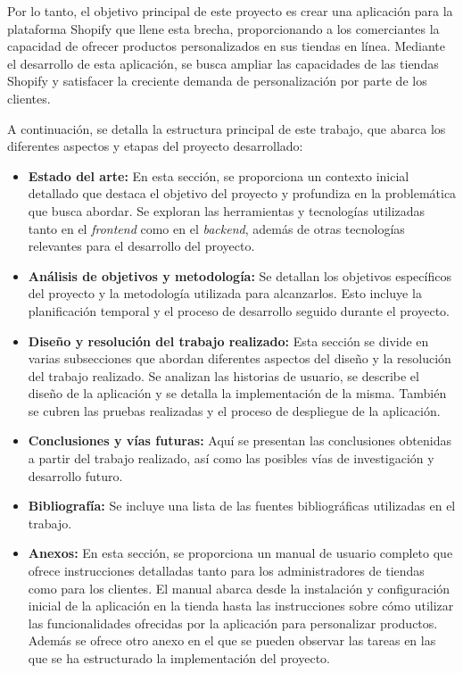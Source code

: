 \documentclass[11pt]{article}
\begin{document}
Por lo tanto, el objetivo principal de este proyecto es crear una aplicación para la plataforma Shopify que llene esta brecha, proporcionando a los comerciantes 
la capacidad de ofrecer productos personalizados en sus tiendas en línea. Mediante el desarrollo de esta aplicación, se busca ampliar las capacidades 
de las tiendas Shopify y satisfacer la creciente demanda de personalización por parte de los clientes.

A continuación, se detalla la estructura principal de este trabajo, que abarca los diferentes aspectos y etapas del proyecto desarrollado:

\begin{itemize}
    \item \textbf{Estado del arte:} En esta sección, se proporciona un contexto inicial detallado que destaca el objetivo del proyecto y profundiza
    en la problemática que busca abordar. Se exploran las herramientas y tecnologías utilizadas tanto en el \textit{frontend} como en el \textit{backend}, además 
    de otras tecnologías relevantes para el desarrollo del proyecto.
    
    \item \textbf{Análisis de objetivos y metodología:} Se detallan los objetivos específicos del proyecto y la metodología utilizada para alcanzarlos.
    Esto incluye la planificación temporal y el proceso de desarrollo seguido durante el proyecto.
    
    \item \textbf{Diseño y resolución del trabajo realizado:} Esta sección se divide en varias subsecciones que abordan diferentes aspectos
    del diseño y la resolución del trabajo realizado. Se analizan las historias de usuario, se describe el diseño de la aplicación y se detalla
    la implementación de la misma. También se cubren las pruebas realizadas y el proceso de despliegue de la aplicación.
    
    \item \textbf{Conclusiones y vías futuras:} Aquí se presentan las conclusiones obtenidas a partir del trabajo realizado, así como las posibles
    vías de investigación y desarrollo futuro.
    
    \item \textbf{Bibliografía:} Se incluye una lista de las fuentes bibliográficas utilizadas en el trabajo.
    
    \item \textbf{Anexos:} En esta sección, se proporciona un manual de usuario completo que ofrece instrucciones detalladas tanto para los
    administradores de tiendas como para los clientes. El manual abarca desde la instalación y configuración inicial de la aplicación en la 
    tienda hasta las instrucciones sobre cómo utilizar las funcionalidades ofrecidas por la aplicación para personalizar productos.
    Además se ofrece otro anexo en el que se pueden observar las tareas en las que se ha estructurado la implementación del proyecto.

\end{itemize}
\end{document}
